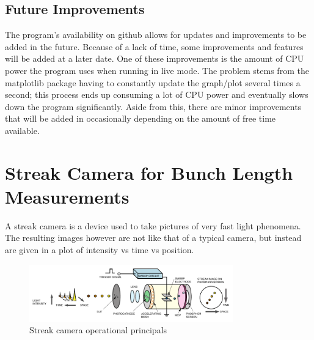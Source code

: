 \documentclass[%
 reprint,%
 amssymb, amsmath,%
 aip,cha,%
]{revtex4-1}
\begin{document}
\subsection{Future Improvements}
The program's availability on github\cite{Note1} allows for updates and improvements to be added in the future. Because of a lack of time, some improvements and features will be added at a later date. One of these improvements is the amount of CPU power the program uses when running in live mode. The problem stems from the matplotlib package having to constantly update the graph/plot several times a second; this process ends up consuming a lot of CPU power and eventually slows down the program significantly. Aside from this, there are minor improvements that will be added in occasionally depending on the amount of free time available.

\section{Streak Camera for Bunch Length Measurements}
A streak camera is a device used to take pictures of very fast light phenomena. The resulting images however are not like that of a typical camera, but instead are given in a plot of intensity vs time vs position.
\begin{figure}[htb]
\begin{center}
\includegraphics[width=250pt]{streakdiagram.pdf}
\caption{Streak camera operational principals\cite{Note2}}
\label{streakdiagram}
\end{center}
\end{figure}
\end{document}
